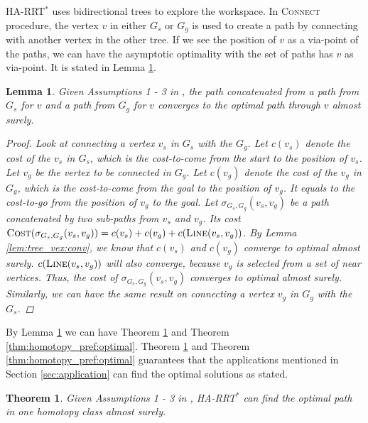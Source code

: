\documentclass[letterpaper, 10 pt, conference]{ieeeconf}
\newtheorem{thm}{Theorem}
\newtheorem{lem}{Lemma}
\begin{document}
HA-RRT$^{*}$ uses bidirectional trees to explore the workspace.
In \textsc{Connect} procedure, the vertex $ v $ in either $ G_{s} $ or $ G_{g} $ is used to create a path by connecting with another vertex in the other tree.
If we see the position of $ v $ as a via-point of the paths, we can have the asymptotic optimality with the set of paths has $ v $ as via-point.
It is stated in Lemma \ref{lem:optimal_via_point}.

\begin{lem}
\label{lem:optimal_via_point}
Given Assumptions 1 - 3 in \cite{Karaman-RSS-10},
the path concatenated from a path from $ G_{s} $ for $ v $ and a path from $ G_{g} $ for $ v $ converges to the optimal path through $ v $ almost surely. 

\begin{proof}
Look at connecting a vertex $ v_{s} $ in $ G_{s} $ with the $ G_{g} $.
Let $ c (v_{s}) $ denote the cost of the $  v_{s}  $ in $ G_{s} $, which is the cost-to-come from the start to the position of $  v_{s} $.
Let $ v_{g} $ be the vertex to be connected in $ G_{g} $.
Let $ c ( v_{g} ) $ denote the cost of the $  v_{g} $ in $ G_{g} $, which is the cost-to-come from the goal to the position of $  v_{g} $.
It equals to the cost-to-go from the position of $ v_{g} $ to the goal.
Let $ \sigma_{G_{s},G_{g}} (v_{s}, v_{g}) $ be a path concatenated by two sub-paths from $  v_{s} $ and $  v_{g} $. 
Its cost $ \mbox{\sc Cost} (\sigma_{G_{s},G_{g}} ( v_{s}, v_{g} )) =  c (v_{s}) + c (v_{g}) + c (\mbox{\sc Line} (v_{s}, v_{g}) ) $.
By Lemma \ref{lem:tree_vex:conv}, we know that $ c (v_{s}) $ and $ c (v_{g}) $ converge to optimal almost surely.
$ c (\mbox{\sc Line} (v_{s}, v_{g})  ) $ will also converge, because $ v_{g} $ is selected from a set of near vertices.
Thus, the cost of $ \sigma_{G_{s},G_{g}} (v_{s}, v_{g}) $ converges to optimal almost surely. 
Similarly, we can have the same result on connecting a vertex $ v_{g} $ in $ G_{g} $ with the $ G_{s} $.
\end{proof}
\end{lem}

By Lemma \ref{lem:optimal_via_point} we can have Theorem \ref{thm:constrained_optimality} and Theorem \ref{thm:homotopy_pref:optimal}.
Theorem \ref{thm:constrained_optimality} and Theorem \ref{thm:homotopy_pref:optimal} guarantees that the applications mentioned in Section \ref{sec:application} can find the optimal solutions as stated.

\begin{thm}
\label{thm:constrained_optimality}
Given Assumptions 1 - 3 in \cite{Karaman-RSS-10},
HA-RRT$^{*}$ can find the optimal path in one homotopy class almost surely.
\end{thm}
\end{document}
